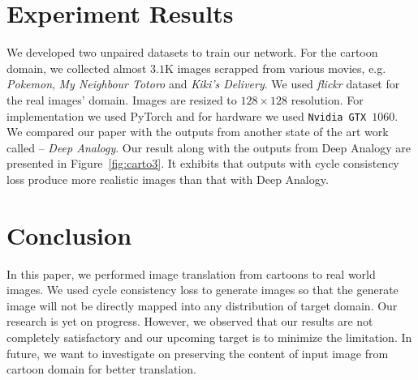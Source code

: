 \documentclass[conference,compsoc]{IEEEtran}
\begin{document}
\section{Experiment Results}
We developed two unpaired datasets to train our network. For the cartoon domain, we collected almost $3.1$K images scrapped from various movies, e.g. \textit{Pokemon}, \textit{My Neighbour Totoro} and \textit{Kiki's Delivery}. We used \textit{flickr} dataset for the real images' domain. Images are resized to $128 \times 128$ resolution. For implementation we used PyTorch and for hardware we used \texttt{Nvidia GTX $1060$}. We compared our paper with the outputs from another state of the art work called -- \textit{Deep Analogy}\cite{liao2017visual}. Our result along with the outputs from Deep Analogy are presented in Figure~\ref{fig:carto3}. It exhibits that outputs with cycle consistency loss produce more realistic images than that with Deep Analogy.


\section{Conclusion}
In this paper, we performed image translation from cartoons to real world images. We used cycle consistency loss to generate images so that the generate image will not be directly mapped into any distribution of target domain. Our research is yet on progress. However, we observed that our results are not completely satisfactory and our upcoming target is to minimize the limitation. In future, we want to investigate on preserving the content of input image from cartoon domain for better translation.






\end{document}
